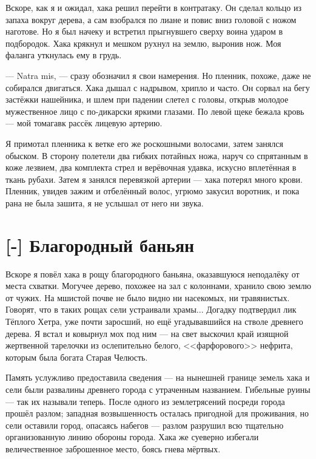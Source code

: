 Вскоре, как я и ожидал, хака решил перейти в контратаку.
Он сделал кольцо из запаха вокруг дерева, а сам взобрался по лиане и повис вниз головой с ножом наготове.
Но я был начеку и встретил прыгнувшего сверху воина ударом в подбородок.
Хака крякнул и мешком рухнул на землю, выронив нож.
Моя фаланга уткнулась ему в грудь.

--- Natra mis\FM, --- сразу обозначил я свои намерения.
Но пленник, похоже, даже не собирался двигаться.
Хака дышал с надрывом, хрипло и часто. Он сорвал на бегу застёжки нашейника, и шлем при падении слетел с головы, открыв молодое мужественное лицо с по-дикарски яркими глазами.
По левой щеке бежала кровь --- мой томагавк рассёк лицевую артерию.

Я примотал пленника к ветке его же роскошными волосами, затем занялся обыском.
В сторону полетели два гибких потайных ножа, наруч со спрятанным в коже лезвием, два комплекта стрел и верёвочная удавка, искусно вплетённая в ткань рубахи.
Затем я занялся перевязкой артерии --- хака потерял много крови.
Пленник, увидев зажим и отбелённый волос, угрюмо закусил воротник, и пока рана не была зашита, я не услышал от него ни звука.

\section{[-] Благородный баньян}

Вскоре я повёл хака в рощу благородного баньяна, оказавшуюся неподалёку от места схватки.
Могучее дерево, похожее на зал с колоннами, хранило свою землю от чужих.
На мшистой почве не было видно ни насекомых, ни травянистых.
Говорят, что в таких рощах сели устраивали храмы...
Догадку подтвердил лик Тёплого Хетра, уже почти заросший, но ещё угадывавшийся на стволе древнего дерева.
Я встал и ковырнул мох под ним --- на свет выскочил край изящной жертвенной тарелочки из ослепительно белого, <<фарфорового>> нефрита, которым была богата Старая Челюсть.

Память услужливо предоставила сведения --- на нынешней границе земель хака и сели были развалины древнего города с утраченным названием.
Гибельные руины --- так их называли теперь.
После одного из землетрясений посреди города прошёл разлом;
западная возвышенность осталась пригодной для проживания, но сели оставили город, опасаясь набегов --- разлом разрушил всю тщательно организованную линию обороны города.
Хака же суеверно избегали величественное заброшенное место, боясь гнева мёртвых.

